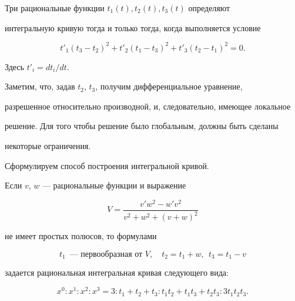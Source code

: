 \begin{thm}


Три рациональные функции $t_1(t),t_2(t),t_3(t)$ определяют 


интегральную кривую тогда и только тогда, когда выполняется условие


$$


t'_1(t_3-t_2)^2+t'_2(t_1-t_3)^2+t'_3(t_2-t_1)^2=0.


$$


Здесь $t'_i=dt_i/dt$.


\end{thm}





Заметим, что, задав $t_2$, $t_3$, получим дифференциальное уравнение, 


разрешенное относительно производной, и, следовательно, имеющее локальное 


решение. Для того чтобы решение было глобальным, должны быть сделаны 


некоторые ограничения. 





Сформулируем способ построения интегральной кривой.








\begin{thm} 


Если $v$, $w$ --- рациональные функции и выражение 


$$


V=\frac{v'w^2-w'v^2}{v^2+w^2+(v+w)^2}


$$ 


не имеет простых полюсов, то формулами 


$$


t_1\ \; \text{--- первообразная от $V$},\quad t_2=t_1+w,\ \ t_3=t_1-v


$$


задается рациональная интегральная кривая следующего вида\/${:}$


$$


x^0:x^1:x^2:x^3=3:t_1+t_2+t_3:t_1t_2+t_1t_3+t_2t_3:3t_1t_2t_3.


$$


\end{thm}





